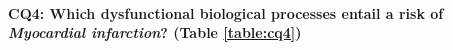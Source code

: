 
\paragraph{CQ4: Which dysfunctional biological processes entail a risk of \textit{Myocardial infarction}?  (Table \ref{table:cq4})}

%

